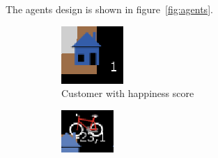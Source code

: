 The agents design is shown in figure~\ref{fig:agents}.
\begin{center}
\begin{figure}
     \centering
     \begin{subfigure}[m]{0.1\textwidth}
         \centering
         \includegraphics[width=\textwidth]{sections/pics/cust_happy}
         \caption{Customer with happiness score}
     \end{subfigure}
     \hfill
     \begin{subfigure}[m]{0.1\textwidth}
         \centering
         \includegraphics[width=\textwidth]{sections/pics/del_on_its_way}

\end{subfigure}
\end{figure}
\end{center}
